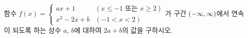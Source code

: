 함수 $f(x)=\begin{cases} ax+1 & (x\le -1 \text{ 또는 } x\ge 2) \\ x^2-2x+b & (-1<x<2) \end{cases}$가 구간 $(-\infty{,}\mkern3mu\mathopen{}\infty)$에서 연속이 되도록 하는 상수 $a$, $b$에 대하여 $2a+b$의 값을 구하시오.
